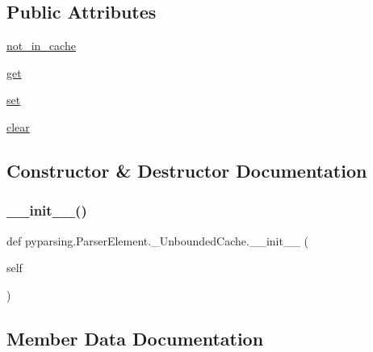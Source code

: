 \subsection*{Public Attributes}
\begin{DoxyCompactItemize}
\item 
\hyperlink{classpyparsing_1_1ParserElement_1_1__UnboundedCache_a92c4a130ed1d1345ace4093cbcd514c2}{not\+\_\+in\+\_\+cache}
\item 
\hyperlink{classpyparsing_1_1ParserElement_1_1__UnboundedCache_aa097418b15f093c83bfdf15dec89b5b3}{get}
\item 
\hyperlink{classpyparsing_1_1ParserElement_1_1__UnboundedCache_aa26613ad084fcf4d3dbe163c4d3bc360}{set}
\item 
\hyperlink{classpyparsing_1_1ParserElement_1_1__UnboundedCache_a894973d80e539778828bd33415b92a69}{clear}
\end{DoxyCompactItemize}


\subsection{Constructor \& Destructor Documentation}
\mbox{\label{classpyparsing_1_1ParserElement_1_1__UnboundedCache_ace4deeb95c5fddd9c8674d9340ba2a78}} 
\subsubsection{\texorpdfstring{\+\_\+\+\_\+init\+\_\+\+\_\+()}{\_\_init\_\_()}}
{\footnotesize\ttfamily def pyparsing.\+Parser\+Element.\+\_\+\+Unbounded\+Cache.\+\_\+\+\_\+init\+\_\+\+\_\+ (\begin{DoxyParamCaption}\item[{}]{self }\end{DoxyParamCaption})}



\subsection{Member Data Documentation}
\mbox{\label{classpyparsing_1_1ParserElement_1_1__UnboundedCache_a894973d80e539778828bd33415b92a69}} 
